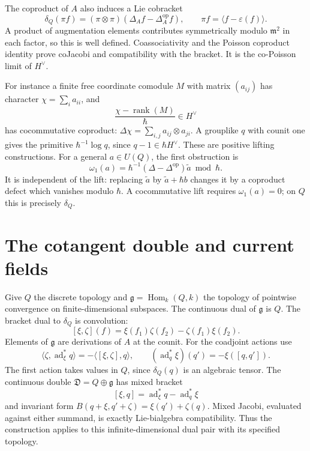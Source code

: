 The coproduct of \(A\) also induces a Lie cobracket
\[
 \delta_Q(\pi f)=(\pi\otimes\pi)
                       (\Delta_Af-\Delta_A^{\mathrm{op}}f),\qquad
 \pi f=\langle f-\varepsilon(f)\rangle.
\]
A product of augmentation elements contributes symmetrically
modulo \(\mathfrak m^2\) in each factor, so this is well defined.
Coassociativity and the Poisson coproduct identity prove coJacobi
and compatibility with the bracket.
It is the co-Poisson limit of \(H^\vee\).

For instance a finite free coordinate comodule \(M\) with matrix
\((a_{ij})\) has character \(\chi=\sum_i a_{ii}\), and
\[
 \frac{\chi-\operatorname{rank}(M)}{\hbar}\in H^\vee
\]
has cocommutative coproduct:
\(\Delta\chi=\sum_{i,j}a_{ij}\otimes a_{ji}\).
A grouplike \(q\) with counit one gives the primitive
\(\hbar^{-1}\log q\), since \(q-1\in\hbar H^\vee\).
These are positive lifting constructions.
For a general \(a\in U(Q)\), the first obstruction is
\[
 \omega_1(a)=\hbar^{-1}
              (\Delta-\Delta^{\mathrm{op}})\widetilde a\bmod\hbar.
\]
It is independent of the lift: replacing \(\widetilde a\)
by \(\widetilde a+\hbar b\) changes it by a coproduct defect
which vanishes modulo \(\hbar\).
A cocommutative lift requires \(\omega_1(a)=0\);
on \(Q\) this is precisely \(\delta_Q\).

\section{The cotangent double and current fields}
\label{cyrep:sec:cotangent-double}

Give \(Q\) the discrete topology and
\(\mathfrak g=\operatorname{Hom}_k(Q,k)\) the topology of
pointwise convergence on finite-dimensional subspaces.
The continuous dual of \(\mathfrak g\) is \(Q\).
The bracket dual to \(\delta_Q\) is convolution:
\[
 [\xi,\zeta](f)=\xi(f_1)\zeta(f_2)-\zeta(f_1)\xi(f_2).
\]
Elements of \(\mathfrak g\) are derivations of \(A\) at the counit.
For the coadjoint actions use
\[
 \langle\zeta,\operatorname{ad}^*_\xi q\rangle
       =-\langle[\xi,\zeta],q\rangle,\qquad
 (\operatorname{ad}^*_q\xi)(q')=-\xi([q,q']).
\]
The first action takes values in \(Q\), since \(\delta_Q(q)\)
is an algebraic tensor.
The continuous double \(\mathfrak D=Q\oplus\mathfrak g\) has
mixed bracket
\[
 [\xi,q]=\operatorname{ad}^*_\xi q-\operatorname{ad}^*_q\xi
\]
and invariant form
\(B(q+\xi,q'+\zeta)=\xi(q')+\zeta(q)\).
Mixed Jacobi, evaluated against either summand, is exactly
Lie-bialgebra compatibility. Thus the construction applies to
this infinite-dimensional dual pair with its specified topology.

